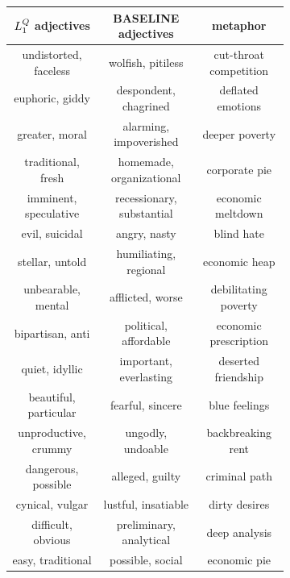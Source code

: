 \documentclass[OpenMind]{stjour}
\newcommand{\Listener}{L}
\newcommand{\QLONE}{\Listener_{{1}}^{{Q}}}
\begin{document}
		\begin{figure}
		\begin{subfigure}{0.3\textwidth}
			\begin{center}

			\setlength\extrarowheight{-10pt}
			\renewcommand{\arraystretch}{0.1}
			\begin{tabular}{ c | c | c  }
			 \tiny $\protect\QLONE$ adjectives & \tiny BASELINE adjectives & \tiny metaphor \\ 
			\hline
			\tiny undistorted, faceless & \tiny wolfish, pitiless & \tiny cut-throat competition\\
			\tiny euphoric, giddy & \tiny despondent, chagrined & \tiny deflated emotions\\
			\tiny greater, moral & \tiny alarming, impoverished & \tiny deeper poverty\\
			\tiny traditional, fresh & \tiny homemade, organizational & \tiny corporate pie\\
			\tiny imminent, speculative & \tiny recessionary, substantial & \tiny economic meltdown\\
			\tiny evil, suicidal & \tiny angry, nasty & \tiny blind hate\\
			\tiny stellar, untold & \tiny humiliating, regional & \tiny economic heap\\
			\tiny unbearable, mental & \tiny afflicted, worse & \tiny debilitating poverty\\
			\tiny bipartisan, anti & \tiny political, affordable & \tiny economic prescription\\
			\tiny quiet, idyllic & \tiny important, everlasting & \tiny deserted friendship\\
			\tiny beautiful, particular & \tiny fearful, sincere & \tiny blue feelings\\
			\tiny unproductive, crummy & \tiny ungodly, undoable & \tiny backbreaking rent\\
			\tiny dangerous, possible & \tiny alleged, guilty & \tiny criminal path\\
			\tiny cynical, vulgar & \tiny lustful, insatiable & \tiny dirty desires\\
			\tiny difficult, obvious & \tiny preliminary, analytical & \tiny deep analysis\\
			\tiny easy, traditional & \tiny possible, social & \tiny economic pie\\

\end{tabular}
\end{center}
\end{subfigure}
\end{figure}
\end{document}
